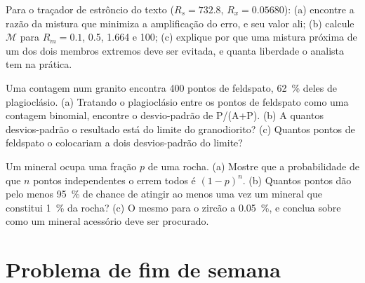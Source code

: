 \begin{exercise}[$\star\star\star$]\label{exo:b2:field-lab-methods-2:10}
Para o traçador de estrôncio do texto ($R_s = 732.8$, $R_x = 0.05680$): (a) encontre a razão da mistura
que minimiza a amplificação do erro, e seu valor ali; (b) calcule $\mathcal M$ para
$R_m = 0.1$, 0.5, 1.664 e 100; (c) explique por que uma mistura próxima de um dos dois membros extremos deve ser
evitada, e quanta liberdade o analista tem na prática.
\end{exercise}

\begin{exercise}[$\star\star\star$]\label{exo:b2:field-lab-methods-2:11}
Uma contagem num granito encontra 400 pontos de feldspato, \qty{62}{\percent} deles de plagioclásio. (a) Tratando o
plagioclásio entre os pontos de feldspato como uma contagem binomial, encontre o desvio-padrão de
P/(A+P). (b) A quantos desvios-padrão o resultado está do limite do granodiorito? (c) Quantos
pontos de feldspato o colocariam a dois desvios-padrão do limite?
\end{exercise}

\begin{exercise}[$\star\star\star$]\label{exo:b2:field-lab-methods-2:12}
Um mineral ocupa uma fração $p$ de uma rocha. (a) Mostre que a probabilidade de que $n$ pontos independentes
o errem todos é $(1-p)^n$. (b) Quantos pontos dão pelo menos \qty{95}{\percent} de chance de
atingir ao menos uma vez um mineral que constitui \qty{1}{\percent} da rocha? (c) O mesmo para o zircão a
\qty{0.05}{\percent}, e conclua sobre como um mineral acessório deve ser procurado.
\end{exercise}

\section*{Problema de fim de semana}

